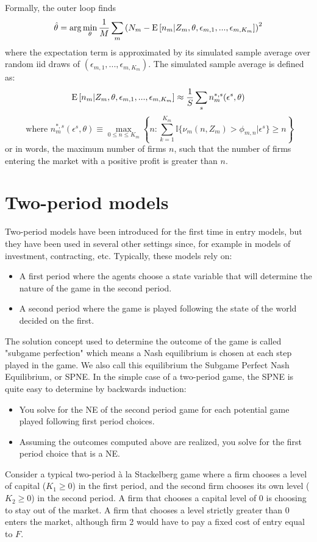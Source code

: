 Formally, the outer loop finds $$\hat\theta = \arg\min_{\theta} \frac{1}{M} \sum_{m} \left( N_m - \operatorname{E}\left[n_m\vert Z_m, \theta, \epsilon_{m,1}, ..., \epsilon_{m,K_m}\right] \right)^2 $$ where the expectation term is approximated by its simulated sample average over random iid draws of $(\epsilon_{m,1}, ..., \epsilon_{m,K_m})$. The simulated sample average is defined as: $$\operatorname{E}\left[n_m\vert Z_m, \theta, \epsilon_{m,1}, ..., \epsilon_{m,K_m}\right] \approx \frac{1}{S} \sum_{s} n_{m}^{*, s} (\epsilon^s, \theta) $$ $$\text{ where } n_{m}^{*, s} (\epsilon^s, \theta) \equiv \max_{0\leq n \leq K_m} \left\lbrace n : \sum_{k=1}^{K_m}\mathbb{I}\{\nu_m(n, Z_m) > \phi_{m,n}\vert \epsilon^s \}\geq n \right\rbrace $$ or in words, the maximum number of firms $n$, such that the number of firms entering the market with a positive profit is greater than $n$.

\section{Two-period models}


Two-period models have been introduced for the first time in entry models, but they have been used in several other settings since, for example in models of investment, contracting, etc. Typically, these models rely on:\begin{itemize}
\item A first period where the agents choose a state variable that will determine the nature of the game in the second period.
\item A second period where the game is played following the state of the world decided on the first.
\end{itemize}
The solution concept used to determine the outcome of the game is called "subgame perfection" which means a Nash equilibrium is chosen at each step played in the game. We also call this equilibrium the Subgame Perfect Nash Equilibrium, or SPNE. In the simple case of a two-period game, the SPNE is quite easy to determine by backwards induction:\begin{itemize}
\item You solve for the NE of the second period game for each potential game played following first period choices.
\item Assuming the outcomes computed above are realized, you solve for the first period choice that is a NE.
\end{itemize}


Consider a typical two-period à la Stackelberg game where a firm chooses a level of capital ($K_1 \geq 0$) in the first period, and the second firm chooses its own level ($K_2 \geq 0$) in the second period. A firm that chooses a capital level of $0$ is choosing to stay out of the market. A firm that chooses a level strictly greater than 0 enters the market, although firm 2 would have to pay a fixed cost of entry equal to $F$.

